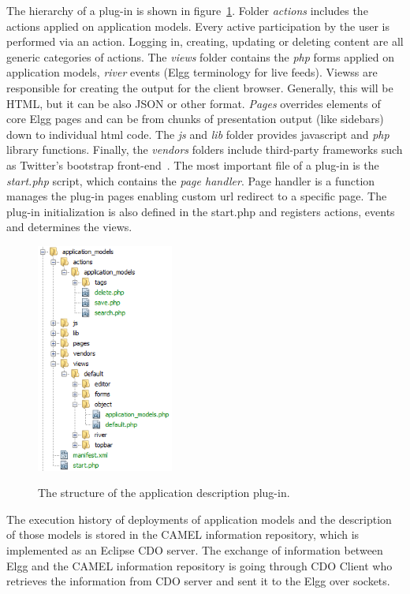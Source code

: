 The hierarchy of a plug-in is shown in figure~\ref{fig:elgg_hierarchy}. 
Folder {\em actions} includes the actions applied on application models. Every active participation by the user is performed via an action. Logging in, creating, updating or deleting content are all generic categories of actions.
The {\em views} folder contains the {\em php} forms applied on application models, {\em river} events (Elgg terminology for live feeds). Viewss are responsible for creating the output for the client browser. Generally, this will be HTML, but it can be also JSON or other format. 
{\em Pages} overrides elements of core Elgg pages and can be from chunks of presentation output (like sidebars) down to individual html code.  
The {\em js} and {\em lib} folder provides javascript and {\em php} library functions. 
Finally, the {\em vendors} folders include third-party frameworks such as Twitter's bootstrap front-end~\cite{bootstrap_url}.
The most important file of a plug-in is the \emph{start.php} script, which contains the \emph{page handler}. Page handler is a function manages the plug-in pages enabling custom url redirect to a specific page. 
The plug-in initialization is also defined in the start.php and registers actions, events and determines the views. 

\begin{figure}[h]
	\caption{The structure of the application description plug-in.}
	\includegraphics[width=0.4\textwidth]{./fig/folder_hierarchy.png}
	\centering
	\label{fig:elgg_hierarchy}
\end{figure}

The execution history of deployments of application models and the description of those models is stored in the CAMEL information repository, which is implemented as an Eclipse CDO server. The exchange of information between Elgg and the CAMEL information repository is going through CDO Client who retrieves the information from CDO server and sent it to the Elgg over sockets.


